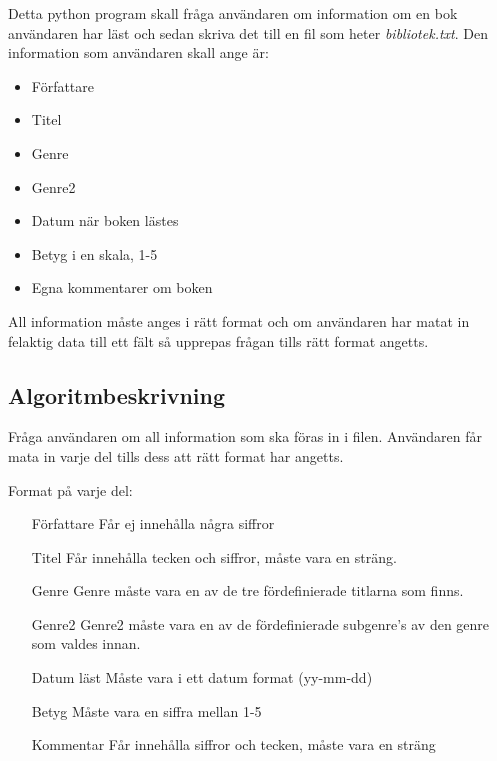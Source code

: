 \documentclass[11pt, titlepage, oneside, a4paper]{article}
\newcommand{\Subsection}[1]{\vspace{-4pt}\subsection{#1}\vspace{-8pt}}
\begin{document}
		Detta python program skall fråga användaren om information om en bok användaren har läst och sedan skriva det till en fil som
		heter \emph{bibliotek.txt}. Den information som användaren skall ange är:
		\begin{itemize}
		\item Författare
		\item Titel
		\item Genre
		\item Genre2
		\item Datum när boken lästes
		\item Betyg i en skala, 1-5
		\item Egna kommentarer om boken
		\end{itemize}
		All information måste anges i rätt format och om användaren har matat in felaktig data till ett fält så upprepas frågan tills rätt format angetts.
		\Subsection{Algoritmbeskrivning}
		Fråga användaren om all information som
		ska föras in i filen. Användaren får mata in varje del tills dess att rätt format har angetts.
		
		Format på varje del:
		\begin{enumerate}
		\item[Författare] Får ej innehålla några siffror
		\item[Titel] Får innehålla tecken och siffror, måste vara en sträng.
		\item[Genre] Genre måste vara en av de tre fördefinierade titlarna som finns.
		\item[Genre2] Genre2 måste vara en av de fördefinierade subgenre's av den genre som valdes innan.
		\item[Datum läst] Måste vara i ett datum format (yy-mm-dd)
		\item[Betyg] Måste vara en siffra mellan 1-5
		\item[Kommentar] Får innehålla siffror och tecken, måste vara en sträng
		\end{enumerate}
		
\end{document}
